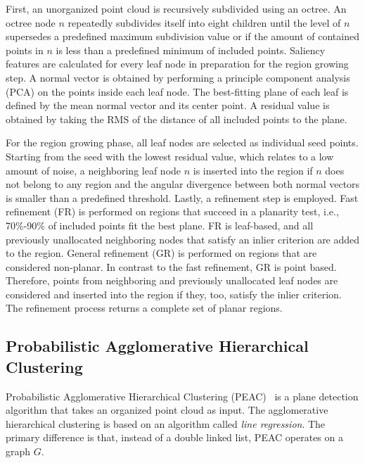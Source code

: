 \documentclass[main.tex]{subfiles}
\begin{document}
First, an unorganized point cloud is recursively subdivided using an octree.
An octree node $n$ repeatedly subdivides itself into eight children until the level of $n$ supersedes a predefined maximum subdivision value or if the
amount of contained points in $n$ is less than a predefined minimum of included points.
Saliency features are calculated for every leaf node in preparation for the region growing step. A normal vector is obtained by performing a principle
component analysis (PCA) on the points inside each leaf node. The best-fitting plane of each leaf is defined by the mean normal vector and its center point.
A residual value is obtained by taking the RMS of the distance of all included points to the plane.

For the region growing phase, all leaf nodes are selected as individual seed points. Starting from the seed with the lowest residual value, which relates to a low amount of noise,
a neighboring leaf node $n$ is inserted into the region if $n$ does not belong to any region and the angular divergence between both normal vectors is smaller than
a predefined threshold.
Lastly, a refinement step is employed.
Fast refinement (FR) is performed on regions that succeed in a planarity test, i.e., 70\%-90\% of included points fit the best plane. FR is leaf-based, and all previously unallocated neighboring nodes that satisfy an inlier criterion are added to the region.
General refinement (GR) is performed on regions that are considered non-planar. In contrast to the fast refinement, GR is point based. Therefore,
points from neighboring and previously unallocated leaf nodes are considered and inserted into the region if they, too, satisfy the inlier criterion.
The refinement process returns a complete set of planar regions.

\subsection{Probabilistic Agglomerative Hierarchical Clustering}
\label{subsec:bg-peac}
Probabilistic Agglomerative Hierarchical Clustering (PEAC)~\cite{Feng_Taguchi_Kamat_2014} is a plane detection algorithm that takes an organized
point cloud as input.
The agglomerative hierarchical clustering is based on an algorithm called
\textit{line regression}\cite[Section~III.B]{Nguyen_Martinelli_Tomatis_Siegwart_2005}. The primary difference is
that, instead of a double linked list, PEAC operates on a graph $G$.
\end{document}
